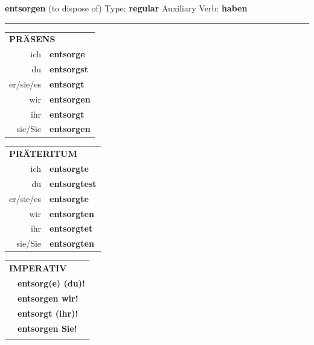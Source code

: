 \documentclass[10pt,a4paper]{revtex4-2}
\begin{document}
\begin{verbbox}
    {\Large \bf entsorgen} (to dispose of) \hfill Type: \textbf{regular} \hfill Auxiliary Verb: \textbf{haben} 
    
     \vspace{5pt}

    \hrule
    
    \vspace{5pt}

  \begin{tabular}{rl}
     \multicolumn{2}{l}{\textbf{PRÄSENS} }\\
    ich & \textbf{entsorge}\\
    du & \textbf{entsorgst}\\
    er/sie/es & \textbf{entsorgt}\\
    wir & \textbf{entsorgen}\\
    ihr & \textbf{entsorgt}\\
    sie/Sie & \textbf{entsorgen}\\
  \end{tabular}
  \hfill
     \begin{tabular}{rl}
    \multicolumn{2}{l}{\textbf{PRÄTERITUM} }\\
    ich & \textbf{entsorgte}\\
    du & \textbf{entsorgtest}\\
    er/sie/es & \textbf{entsorgte}\\
    wir & \textbf{entsorgten}\\
    ihr & \textbf{entsorgtet}\\
    sie/Sie & \textbf{entsorgten}\\
  \end{tabular}
  \hfill
  \begin{tabular}{rl}
     \multicolumn{2}{l}{\textbf{IMPERATIV} }\\
   & \textbf{entsorg(e) (du)!}\\
   & \textbf{entsorgen wir!}\\
   & \textbf{entsorgt (ihr)!}\\
   & \textbf{entsorgen Sie!}\\
   & \vspace{10pt}
  \end{tabular}

    \vspace{10pt}


\end{verbbox}
\end{document}
